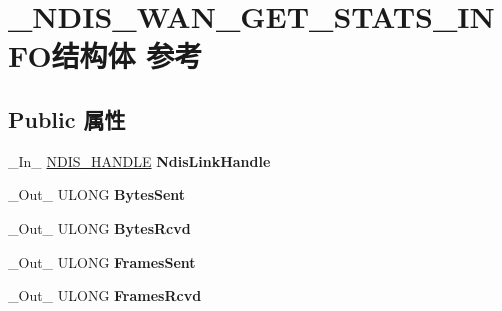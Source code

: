 \hypertarget{struct___n_d_i_s___w_a_n___g_e_t___s_t_a_t_s___i_n_f_o}{}\section{\+\_\+\+N\+D\+I\+S\+\_\+\+W\+A\+N\+\_\+\+G\+E\+T\+\_\+\+S\+T\+A\+T\+S\+\_\+\+I\+N\+F\+O结构体 参考}
\label{struct___n_d_i_s___w_a_n___g_e_t___s_t_a_t_s___i_n_f_o}
\subsection*{Public 属性}
\begin{DoxyCompactItemize}
\item 
\mbox{\label{struct___n_d_i_s___w_a_n___g_e_t___s_t_a_t_s___i_n_f_o_ad79d2c8a2ea7edf54258f9999458d6a1}} 
\+\_\+\+In\+\_\+ \hyperlink{interfacevoid}{N\+D\+I\+S\+\_\+\+H\+A\+N\+D\+LE} {\bfseries Ndis\+Link\+Handle}
\item 
\mbox{\label{struct___n_d_i_s___w_a_n___g_e_t___s_t_a_t_s___i_n_f_o_af5436683fd85b5e57f2161782d355b08}} 
\+\_\+\+Out\+\_\+ U\+L\+O\+NG {\bfseries Bytes\+Sent}
\item 
\mbox{\label{struct___n_d_i_s___w_a_n___g_e_t___s_t_a_t_s___i_n_f_o_a9a327a3e5558580fcc0a70ed271d0286}} 
\+\_\+\+Out\+\_\+ U\+L\+O\+NG {\bfseries Bytes\+Rcvd}
\item 
\mbox{\label{struct___n_d_i_s___w_a_n___g_e_t___s_t_a_t_s___i_n_f_o_a5b009cd768b38458e2fcd5405193d824}} 
\+\_\+\+Out\+\_\+ U\+L\+O\+NG {\bfseries Frames\+Sent}
\item 
\mbox{\label{struct___n_d_i_s___w_a_n___g_e_t___s_t_a_t_s___i_n_f_o_aedc053ad4684dffe2f82783054638a79}} 
\+\_\+\+Out\+\_\+ U\+L\+O\+NG {\bfseries Frames\+Rcvd}
\item 
\mbox{\label{struct___n_d_i_s___w_a_n___g_e_t___s_t_a_t_s___i_n_f_o_a372151e1541755bb067a5d401610fc1d}} 

\end{DoxyCompactItemize}
